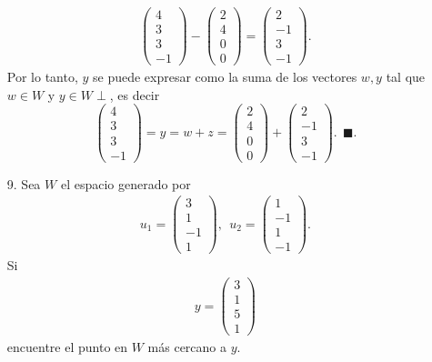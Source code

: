 \documentclass[11pt,letterpaper]{article}
\newcommand{\finf}{\blacksquare.}
\begin{document}
\begin{itemize}
\begin{align*}
\begin{pmatrix}
4\\ 3\\ 3\\-1
\end{pmatrix}-\begin{pmatrix}
2\\ 4 \\ 0 \\ 0
\end{pmatrix} = \begin{pmatrix} 2\\ -1\\ 3 \\ -1
\end{pmatrix}.
\end{align*}
Por lo tanto, $y$ se puede expresar como la suma de los vectores $w, y$ tal que $w\in W$ y $y\in W\perp$, es decir
$$\begin{pmatrix}
4\\ 3\\ 3\\-1
\end{pmatrix}=y = w+z=\begin{pmatrix}
2\\ 4 \\ 0 \\ 0
\end{pmatrix}+\begin{pmatrix} 2\\ -1\\ 3 \\ -1
\end{pmatrix}. \ \ \finf$$

\item[9.] Sea $W$ el espacio generado por 
\begin{align*}
u_1=\begin{pmatrix} 3\\1\\ -1 \\ 1 \end{pmatrix}, \ \ 
u_2=\begin{pmatrix} 1\\-1\\ 1 \\ -1 \end{pmatrix}.
\end{align*}
Si 
\begin{align*}
y =\begin{pmatrix}
3\\1\\5\\1
\end{pmatrix}
\end{align*}
encuentre el punto en $W$ más cercano a $y$.


\end{itemize}
\end{document}

